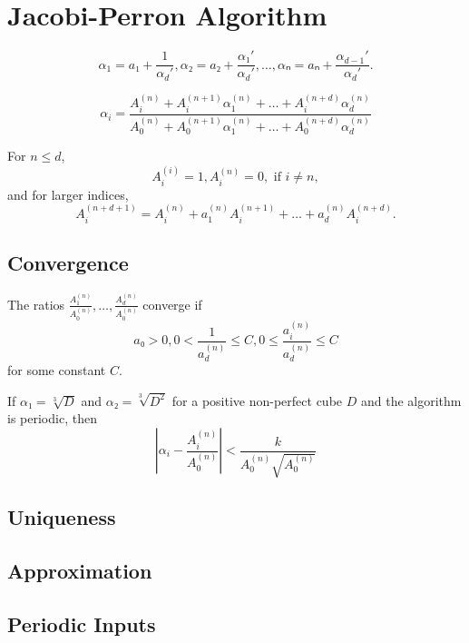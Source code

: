 \chapter{Jacobi-Perron Algorithm}

\[
  α_1 = a₁ + \frac{1}{α_d'}, α₂ = a₂ + \frac{α₁'}{α_d'}, …, αₙ = aₙ + \frac{α_{d-1}'}{α_d'}.
\]

\[
  α_i =
  \frac{A_i^{(n)} + A_i^{(n+1)} α_1^{(n)} + \dots + A_i^{(n+d)} α_d^{(n)}}
       {A_0^{(n)} + A_0^{(n+1)} α_1^{(n)} + \dots + A_0^{(n+d)} α_d^{(n)}}
\]

For $n ≤ d$,
\[
  A_i^{(i)} = 1, A_i^{(n)} = 0, \text{ if } i ≠ n,
\]
and for larger indices,
\[
  A_i^{(n+d+1)} = A_i^{(n)} + a_1^{(n)} A_i^{(n+1)} + \dots + a_d^{(n)} A_i^{(n+d)}.
\]

\section{Convergence}

\begin{theorem}
  The ratios $\frac{A_1^{(n)}}{A_0^{(n)}}, …, \frac{A_d^{(n)}}{A_0^{(n)}}$ converge if
  \[
    a₀ > 0, 0 < \frac{1}{a_d^{(n)}} ≤ C, 0 ≤ \frac{a_i^{(n)}}{a_d^{(n)}} ≤ C
  \]
  for some constant $C$.
\end{theorem}

If $α₁ = \sqrt[3]{D}$ and $α₂ = \sqrt[3]{D^2}$ for a positive non-perfect cube $D$
and the algorithm is periodic, then
\[
  \left| α_i - \frac{A_i^{(n)}}{A_0^{(n)}} \right| < \frac{k}{A_0^{(n)} \sqrt{A_0^{(n)}}}
\]

\section{Uniqueness}

\section{Approximation}

\section{Periodic Inputs}
